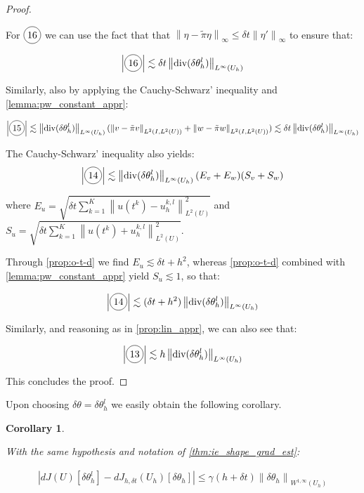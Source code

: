 \documentclass[english,a4paper,9pt,oneside]{scrbook}	%
\theoremstyle{break}
\newtheorem{cor}[equation]{Corollary}
\newenvironment{mproof}[1][\proofname]{%
  \begin{proof}[#1]$ $\par\nobreak\ignorespaces
}{%
  \end{proof}
}
\renewcommand*{\proofname}{Proof}
\theoremstyle{remark}
\newcommand{\ds}{\displaystyle}
\newcommand{\norm}[1]{\left\lVert#1\right\rVert}
\newcommand{\te}{\theta}
\newcommand{\dive}{\text{div}}
\newcommand*\circled[1]{\tikz[baseline=(char.base)]{
            \node[shape=circle,draw,inner sep=2pt] (char) {#1};}}
\begin{document}
\begin{mproof}
For $\circled{16}$ we can use the fact that that $\norm{\eta -\tilde{\pi} \eta}_\infty\leq \delta t \norm{\eta'}_\infty$ to ensure that:

\begin{align*}
	\left | \circled{16} \right |\lesssim \delta t \norm{\dive(\delta \te_h^l)}_{L^\infty(U_h)}
\end{align*}

Similarly, also by applying the Cauchy-Schwarz' inequality and \cref{lemma:pw_constant_appr}:

\begin{align*}
	\left | \circled{15} \right |\lesssim  \norm{\dive(\delta \te_h^l)}_{L^\infty(U_h)} (\norm{v-\tilde{\pi} v}_{L^2(I,L^2(U))}+\norm{w-\tilde{\pi} w}_{L^2(I,L^2(U))})\lesssim \delta t \norm{\dive(\delta \te_h^l)}_{L^\infty(U_h)}
\end{align*}

The Cauchy-Schwarz' inequality also yields:
\begin{align*}
	\left | \circled{14} \right | \lesssim \norm{\dive(\delta \te_h^l)}_{L^\infty(U_h)}(E_v+E_w)(S_v+S_w)
\end{align*}

where $\ds E_u = \sqrt{\delta t \sum_{k=1}^{K}\norm{u(t^k)-u_h^{k,l}}_{L^2(U)}^2}$ and $\ds S_u = \sqrt{\delta t \sum_{k=1}^{K}\norm{u(t^k)+u_h^{k,l}}_{L^2(U)}^2} $.

Through \cref{prop:o-t-d} we find $E_u \lesssim \delta t + h^2$, whereas \cref{prop:o-t-d} combined with \cref{lemma:pw_constant_appr} yield $S_u \lesssim 1$, so that:

\begin{align*}
	\left | \circled{14} \right | \lesssim (\delta t + h^2)\norm{\dive(\delta \te_h^l)}_{L^\infty(U_h)}
\end{align*}


Similarly, and reasoning as in \cref{prop:lin_appr}, we can also see that:

\begin{align*}
	\left | \circled{13} \right | \lesssim h \norm{\dive(\delta \te_h^l)}_{L^\infty(U_h)}
\end{align*}

This concludes the proof.
\end{mproof}

Upon choosing $\delta \te = \delta \te_h^l$ we easily obtain the following corollary.

\begin{cor}
\label{cor:ie_shape_grad_est}

With the same hypothesis and notation of \cref{thm:ie_shape_grad_est}:

\begin{align*}
|dJ(	U)[\delta \te_h^l]-dJ_{h,\delta t}(U_h)[\delta \te_h]|\leq \gamma (h+\delta t)\norm{\delta \te_h}_{W^{1,\infty}(U_h)}
\end{align*}

\end{cor}
\end{document}
